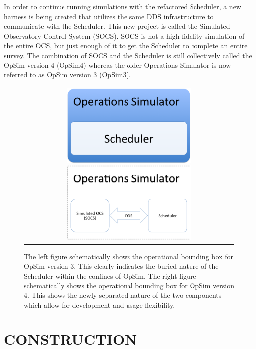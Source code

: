 \documentclass[]{spie}  %
\begin{document}
In order to continue running simulations with the refactored Scheduler, a new harness is being created that utilizes the same DDS infrastructure to communicate with the Scheduler. This new project is called the Simulated Observatory Control System (SOCS). SOCS is not a high fidelity simulation of the entire OCS, but just enough of it to get the Scheduler to complete an entire survey. The combination of SOCS and the Scheduler is still collectively called the OpSim version 4 (OpSim4) whereas the older Operations Simulator is now referred to as OpSim version 3 (OpSim3).

\begin{figure} [ht]
  	\begin{center}
  		\begin{tabular}{c} 
  			\includegraphics[height=4cm]{Opsimv3.png}
  			\includegraphics[height=4cm]{Opsimv4.png}
  		\end{tabular}
  	\end{center}
  	\caption[What is this?] 
  	{ \label{fig:opsim} 
  		The left figure schematically shows the operational bounding box for OpSim version 3. This clearly indicates the buried nature of the Scheduler within the confines of OpSim. The right figure schematically shows the operational bounding box for OpSim version 4. This shows the newly separated nature of the two components which allow for development and usage flexibility.}
\end{figure} 

\section{CONSTRUCTION}
\label{sec:construction}
\end{document}
